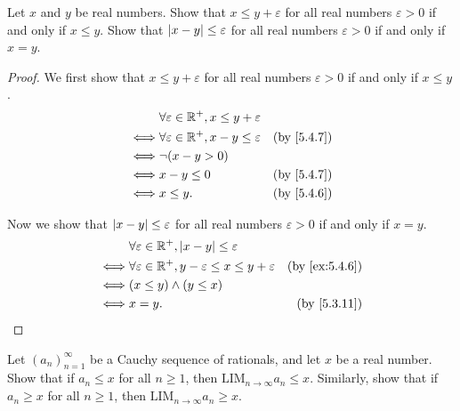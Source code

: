 \begin{ex}\label{ex:5.4.7}
  Let \(x\) and \(y\) be real numbers.
  Show that \(x \leq y + \varepsilon\) for all real numbers \(\varepsilon > 0\) if and only if \(x \leq y\).
  Show that \(\left\lvert x - y\right\rvert \leq \varepsilon\) for all real numbers \(\varepsilon > 0\) if and only if \(x = y\).
\end{ex}

\begin{proof}
  We first show that \(x \leq y + \varepsilon\) for all real numbers \(\varepsilon > 0\) if and only if \(x \leq y\).
  \begin{align*}
         & \forall \varepsilon \in \R^+, x \leq y + \varepsilon                            \\
    \iff & \forall \varepsilon \in \R^+, x - y \leq \varepsilon & \text{(by \cref{5.4.7})} \\
    \iff & \lnot (x - y > 0)                                                               \\
    \iff & x - y \leq 0                                         & \text{(by \cref{5.4.7})} \\
    \iff & x \leq y.                                            & \text{(by \cref{5.4.6})}
  \end{align*}

  Now we show that \(\left\lvert x - y\right\rvert \leq \varepsilon\) for all real numbers \(\varepsilon > 0\) if and only if \(x = y\).
  \begin{align*}
         & \forall \varepsilon \in \R^+, \abs{x - y} \leq \varepsilon                                              \\
    \iff & \forall \varepsilon \in \R^+, y - \varepsilon \leq x \leq y + \varepsilon & \text{(by \cref{ex:5.4.6})} \\
    \iff & (x \leq y) \land (y \leq x)                                                                             \\
    \iff & x = y.                                                                    & \text{(by \cref{5.3.11})}
  \end{align*}
\end{proof}

\begin{ex}\label{ex:5.4.8}
  Let \((a_n)_{n = 1}^{\infty}\) be a Cauchy sequence of rationals, and let \(x\) be a real number.
  Show that if \(a_n \leq x\) for all \(n \geq 1\), then \(\text{LIM}_{n \to \infty} a_n \leq x\).
  Similarly, show that if \(a_n \geq x\) for all \(n \geq 1\), then \(\text{LIM}_{n \to \infty} a_n \geq x\).
\end{ex}

